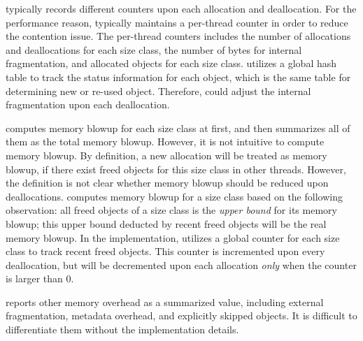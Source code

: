\MP{} typically records different counters upon each allocation and deallocation. For the performance reason, \MP{} typically maintains a per-thread counter in order to reduce the contention issue. The per-thread counters includes the number of allocations and deallocations for each size class, the number of bytes for internal fragmentation, and allocated objects for each size class. 
\MP{} utilizes a global hash table to track the status information for each object, which is the same table for determining new or re-used object. Therefore, \MP{} could adjust the internal fragmentation upon each deallocation. 

\MP{} computes memory blowup for each size class at first, and then summarizes all of them as the total memory blowup. However, it is not intuitive to compute memory blowup. By definition, a new allocation will be treated as memory blowup, if there exist freed objects for this size class in other threads. However, the definition is not clear whether memory blowup should be reduced upon deallocations. \MP{} computes memory blowup for a size class based on the following observation: all freed objects of a size class is the \textit{upper bound} for its memory blowup; this upper bound deducted by recent freed objects will be the real memory blowup. In the implementation, \MP{} utilizes a global counter for each size class to track recent freed objects. This counter is incremented upon every deallocation, but will be decremented upon each allocation \textit{only} when the counter is larger than 0.  

 \MP{} reports other memory overhead as a summarized value, including external fragmentation, metadata overhead, and explicitly skipped objects. It is difficult to differentiate them without the implementation details. %
 

 

